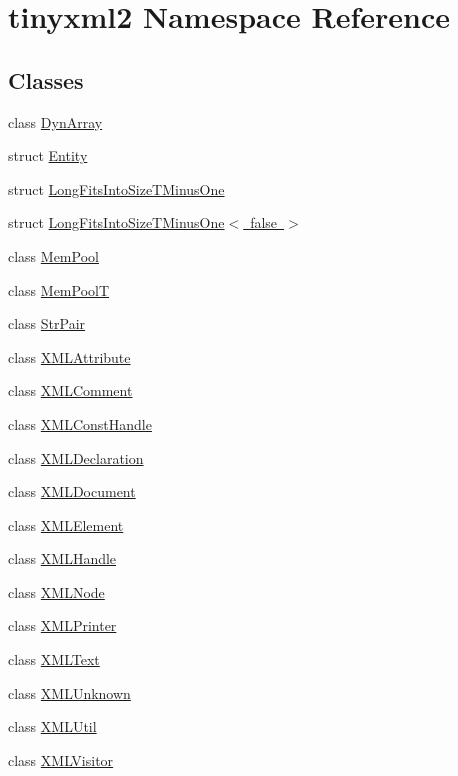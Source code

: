 \hypertarget{namespacetinyxml2}{}\section{tinyxml2 Namespace Reference}
\label{namespacetinyxml2}
\subsection*{Classes}
\begin{DoxyCompactItemize}
\item 
class \mbox{\hyperlink{classtinyxml2_1_1_dyn_array}{Dyn\+Array}}
\item 
struct \mbox{\hyperlink{structtinyxml2_1_1_entity}{Entity}}
\item 
struct \mbox{\hyperlink{structtinyxml2_1_1_long_fits_into_size_t_minus_one}{Long\+Fits\+Into\+Size\+T\+Minus\+One}}
\item 
struct \mbox{\hyperlink{structtinyxml2_1_1_long_fits_into_size_t_minus_one_3_01false_01_4}{Long\+Fits\+Into\+Size\+T\+Minus\+One$<$ false $>$}}
\item 
class \mbox{\hyperlink{classtinyxml2_1_1_mem_pool}{Mem\+Pool}}
\item 
class \mbox{\hyperlink{classtinyxml2_1_1_mem_pool_t}{Mem\+PoolT}}
\item 
class \mbox{\hyperlink{classtinyxml2_1_1_str_pair}{Str\+Pair}}
\item 
class \mbox{\hyperlink{classtinyxml2_1_1_x_m_l_attribute}{X\+M\+L\+Attribute}}
\item 
class \mbox{\hyperlink{classtinyxml2_1_1_x_m_l_comment}{X\+M\+L\+Comment}}
\item 
class \mbox{\hyperlink{classtinyxml2_1_1_x_m_l_const_handle}{X\+M\+L\+Const\+Handle}}
\item 
class \mbox{\hyperlink{classtinyxml2_1_1_x_m_l_declaration}{X\+M\+L\+Declaration}}
\item 
class \mbox{\hyperlink{classtinyxml2_1_1_x_m_l_document}{X\+M\+L\+Document}}
\item 
class \mbox{\hyperlink{classtinyxml2_1_1_x_m_l_element}{X\+M\+L\+Element}}
\item 
class \mbox{\hyperlink{classtinyxml2_1_1_x_m_l_handle}{X\+M\+L\+Handle}}
\item 
class \mbox{\hyperlink{classtinyxml2_1_1_x_m_l_node}{X\+M\+L\+Node}}
\item 
class \mbox{\hyperlink{classtinyxml2_1_1_x_m_l_printer}{X\+M\+L\+Printer}}
\item 
class \mbox{\hyperlink{classtinyxml2_1_1_x_m_l_text}{X\+M\+L\+Text}}
\item 
class \mbox{\hyperlink{classtinyxml2_1_1_x_m_l_unknown}{X\+M\+L\+Unknown}}
\item 
class \mbox{\hyperlink{classtinyxml2_1_1_x_m_l_util}{X\+M\+L\+Util}}
\item 
class \mbox{\hyperlink{classtinyxml2_1_1_x_m_l_visitor}{X\+M\+L\+Visitor}}
\end{DoxyCompactItemize}
